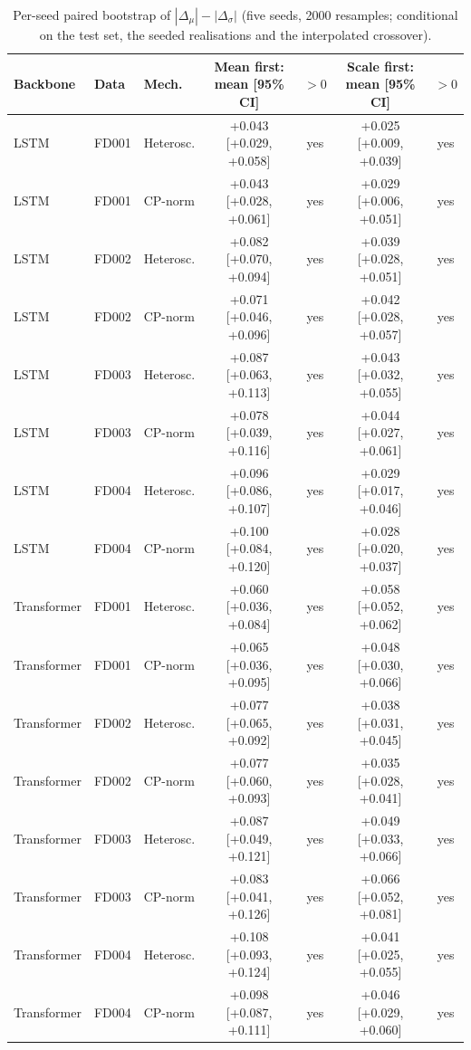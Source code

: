 \documentclass[10pt,a4paper]{article}
\begin{document}
\begin{center}\scriptsize\begin{longtable}{lllcccc}
\caption{Per-seed paired bootstrap of $|\Delta_\mu|-|\Delta_\sigma|$ (five seeds, 2000 resamples; conditional on the test set, the seeded realisations and the interpolated crossover).}\\
\toprule Backbone & Data & Mech. & Mean first: mean [95\% CI] & $>0$ & Scale first: mean [95\% CI] & $>0$ \\ \midrule \endhead
LSTM & FD001 & Heterosc. & +0.043 [+0.029, +0.058] & yes & +0.025 [+0.009, +0.039] & yes \\
LSTM & FD001 & CP-norm & +0.043 [+0.028, +0.061] & yes & +0.029 [+0.006, +0.051] & yes \\
LSTM & FD002 & Heterosc. & +0.082 [+0.070, +0.094] & yes & +0.039 [+0.028, +0.051] & yes \\
LSTM & FD002 & CP-norm & +0.071 [+0.046, +0.096] & yes & +0.042 [+0.028, +0.057] & yes \\
LSTM & FD003 & Heterosc. & +0.087 [+0.063, +0.113] & yes & +0.043 [+0.032, +0.055] & yes \\
LSTM & FD003 & CP-norm & +0.078 [+0.039, +0.116] & yes & +0.044 [+0.027, +0.061] & yes \\
LSTM & FD004 & Heterosc. & +0.096 [+0.086, +0.107] & yes & +0.029 [+0.017, +0.046] & yes \\
LSTM & FD004 & CP-norm & +0.100 [+0.084, +0.120] & yes & +0.028 [+0.020, +0.037] & yes \\
Transformer & FD001 & Heterosc. & +0.060 [+0.036, +0.084] & yes & +0.058 [+0.052, +0.062] & yes \\
Transformer & FD001 & CP-norm & +0.065 [+0.036, +0.095] & yes & +0.048 [+0.030, +0.066] & yes \\
Transformer & FD002 & Heterosc. & +0.077 [+0.065, +0.092] & yes & +0.038 [+0.031, +0.045] & yes \\
Transformer & FD002 & CP-norm & +0.077 [+0.060, +0.093] & yes & +0.035 [+0.028, +0.041] & yes \\
Transformer & FD003 & Heterosc. & +0.087 [+0.049, +0.121] & yes & +0.049 [+0.033, +0.066] & yes \\
Transformer & FD003 & CP-norm & +0.083 [+0.041, +0.126] & yes & +0.066 [+0.052, +0.081] & yes \\
Transformer & FD004 & Heterosc. & +0.108 [+0.093, +0.124] & yes & +0.041 [+0.025, +0.055] & yes \\
Transformer & FD004 & CP-norm & +0.098 [+0.087, +0.111] & yes & +0.046 [+0.029, +0.060] & yes \\
\bottomrule
\end{longtable}\end{center}
\end{document}
